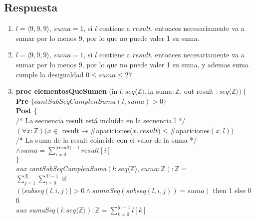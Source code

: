\documentclass[a4paper]{article}
\begin{document}
\subsection*{Respuesta}
	\begin{enumerate}[label=\alph*)]
		\item $l= \langle 9,9,9\rangle$, $suma=1$, si $l$ contiene a $result$, entonces necesariamente va a sumar por lo menos 9, por lo que no puede valer 1 su suma.
		\item $l= \langle 9,9,9\rangle$, $suma=1$, si $l$ contiene a $result$, entonces necesariamente va a sumar por lo menos 9, por lo que no puede valer 1 su suma, y ademas suma cumple la desigualdad $0\leq suma\leq 27$
		\item \textbf{proc elementosQueSumen }(in $l:seq\langle \mathbb{Z}\rangle,$in suma$:\mathbb{Z}$, out result $:seq\langle \mathbb{Z}\rangle)\ \{$\\
\hspace*{6mm}\textbf{Pre }$\{cantSubSeqCumplenSuma(l,suma)>0\}$\\
\hspace*{6mm}\textbf{Post }$\{$\\
\hspace*{6mm}/* La secuencia result está incluída en la secuencia l */\\
\hspace*{6mm}$(\forall x:\mathbb{Z})(x\in $ result$ \rightarrow \#$apariciones($x,result)\leq \#$apariciones$(x,l)$)\\
\hspace*{6mm}/* La suma de la result coincide con el valor de la suma */\\
\hspace*{6mm}$\wedge suma=\sum_{i=0}^{|result|-1}result[i]$\\
\hspace*{6mm}$\}$\medskip \\

		\textit{aux cantSubSeqCumplenSuma}$(l:seq\langle \mathbb{Z}\rangle,suma :\mathbb{Z}):\mathbb{Z}=$\smallskip \\
			\hspace*{4mm}$\sum_{j=1}^{|l|}\sum_{i=0}^{|l|-1}$ if $(|subseq(l,i,j)|>0 \wedge
			 sumaSeq(subseq(l,i,j))=suma)$ 
			then 1 else 0 fi \bigskip \\
		\textit{aux sumaSeq}$(l:seq\langle \mathbb{Z}\rangle):\mathbb{Z}=\sum_{k=0}^{|l|-1}l[k]$
	\end{enumerate}
	
\end{document}
